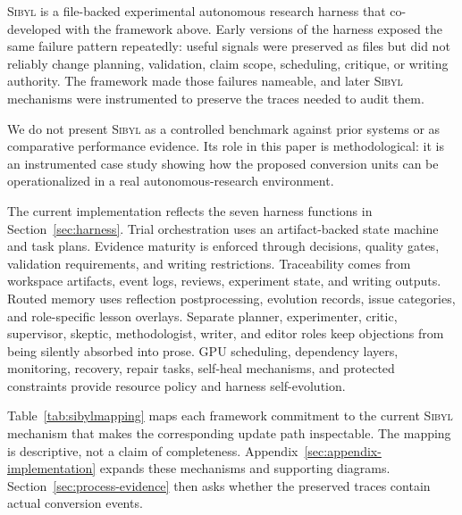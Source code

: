 \documentclass{article}
\newcommand{\sibyl}{\textsc{Sibyl}}
\begin{document}
\sibyl{} is a file-backed experimental autonomous research harness that co-developed with the framework above. Early versions of the harness exposed the same failure pattern repeatedly: useful signals were preserved as files but did not reliably change planning, validation, claim scope, scheduling, critique, or writing authority. The framework made those failures nameable, and later \sibyl{} mechanisms were instrumented to preserve the traces needed to audit them.

We do not present \sibyl{} as a controlled benchmark against prior systems or as comparative performance evidence. Its role in this paper is methodological: it is an instrumented case study showing how the proposed conversion units can be operationalized in a real autonomous-research environment.

The current implementation reflects the seven harness functions in Section~\ref{sec:harness}. Trial orchestration uses an artifact-backed state machine and task plans. Evidence maturity is enforced through decisions, quality gates, validation requirements, and writing restrictions. Traceability comes from workspace artifacts, event logs, reviews, experiment state, and writing outputs. Routed memory uses reflection postprocessing, evolution records, issue categories, and role-specific lesson overlays. Separate planner, experimenter, critic, supervisor, skeptic, methodologist, writer, and editor roles keep objections from being silently absorbed into prose. GPU scheduling, dependency layers, monitoring, recovery, repair tasks, self-heal mechanisms, and protected constraints provide resource policy and harness self-evolution.

Table~\ref{tab:sibylmapping} maps each framework commitment to the current \sibyl{} mechanism that makes the corresponding update path inspectable. The mapping is descriptive, not a claim of completeness. Appendix~\ref{sec:appendix-implementation} expands these mechanisms and supporting diagrams. Section~\ref{sec:process-evidence} then asks whether the preserved traces contain actual conversion events.
\end{document}
